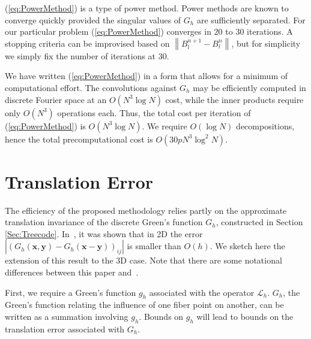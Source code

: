 \documentclass[preprint,12pt]{elsarticle}
\newcommand{\norm}[1]{\left\lVert#1\right\rVert}
\newcommand{\B}[1]{\mathbf{#1}}
\newcommand{\C}[1]{\mathcal{#1}}
\begin{document}
(\ref{eq:PowerMethod}) is a type of power method. Power methods are known to converge quickly provided the singular values of $G_h$ are sufficiently separated. For our particular problem (\ref{eq:PowerMethod}) converges in $20$ to $30$ iterations. A stopping criteria can be improvised based on $\norm{B_l^{n+1} - B_l^n}$, but for simplicity we simply fix the number of iterations at 30.

We have written (\ref{eq:PowerMethod}) in a form that allows for a minimum of computational effort. The convolutions against $G_h$ may be efficiently computed in discrete Fourier space at an $O(N^3\log N)$ cost, while the inner products require only $O(N^3)$ operations each. Thus, the total cost per iteration of (\ref{eq:PowerMethod}) is $O(N^3\log N)$. We require $O(\log N)$ decompositions, hence the total precomputational cost is $O(30pN^3\log^2 N)$.









\section{Translation Error}
\label{Sec:TranslationError}
The efficiency of the proposed methodology relies partly on the approximate translation invariance of the discrete Green's function $G_h$, constructed in Section \ref{Sec:Treecode}. In~\cite{IBM_Implicit2D}, it was shown  that in 2D the error $|(G_h(\B{x},\B{y})-G_h(\B{x}-\B{y}))_{ij}|$ is smaller than $O(h)$. We sketch here the extension of this result to the 3D case. Note that there are some notational differences between this paper and~\cite{IBM_Implicit2D}.

First, we require a Green's function $g_h$ associated with the operator $\C{L}_h$. $G_h$, the Green's function relating the influence of one fiber point on another, can be written as a summation involving $g_h$. Bounds on $g_h$ will lead to bounds on the translation error associated with $G_h$.
\end{document}
